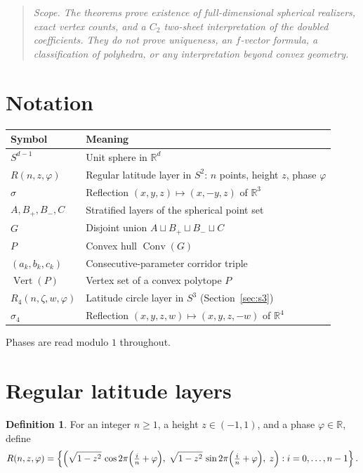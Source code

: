 \documentclass[11pt]{article}
\theoremstyle{definition}
\newtheorem{definition}[theorem]{Definition}
\theoremstyle{remark}
\newcommand{\Vertset}{\operatorname{Vert}}
\newcommand{\Conv}{\operatorname{Conv}}
\newcommand{\Ctwo}{C_2}
\begin{document}
\begin{quote}\itshape
Scope. The theorems prove existence of full-dimensional spherical
realizers, exact vertex counts, and a $\Ctwo$ two-sheet interpretation of
the doubled coefficients. They do not prove uniqueness, an $f$-vector
formula, a classification of polyhedra, or any interpretation beyond
convex geometry.
\end{quote}

\section{Notation}\label{sec:notation}

\begin{center}
\begin{tabular}{ll}
\toprule
Symbol & Meaning \\
\midrule
$S^{d-1}$ & Unit sphere in $\mathbb R^d$ \\
$R(n,z,\varphi)$ & Regular latitude layer in $S^2$: $n$ points, height $z$, phase $\varphi$ \\
$\sigma$ & Reflection $(x,y,z)\mapsto(x,-y,z)$ of $\mathbb R^3$ \\
$A, B_+, B_-, C$ & Stratified layers of the spherical point set \\
$G$ & Disjoint union $A\sqcup B_+\sqcup B_-\sqcup C$ \\
$P$ & Convex hull $\Conv(G)$ \\
$(a_k,b_k,c_k)$ & Consecutive-parameter corridor triple \\
$\Vertset(P)$ & Vertex set of a convex polytope $P$ \\
$R_4(n,\zeta,w,\varphi)$ & Latitude circle layer in $S^3$ (Section~\ref{sec:s3}) \\
$\sigma_4$ & Reflection $(x,y,z,w)\mapsto(x,y,z,-w)$ of $\mathbb R^4$ \\
\bottomrule
\end{tabular}
\end{center}

Phases are read modulo $1$ throughout.

\section{Regular latitude layers}\label{sec:layers}

\begin{definition}\label{def:layer}
For an integer $n\ge1$, a height $z\in(-1,1)$, and a phase
$\varphi\in\mathbb R$, define
\[
R(n,z,\varphi)=\left\{\left(\sqrt{1-z^2}\,\cos 2\pi\Bigl(\tfrac{i}{n}+\varphi\Bigr),\;
\sqrt{1-z^2}\,\sin 2\pi\Bigl(\tfrac{i}{n}+\varphi\Bigr),\; z\right) : i=0,\dots,n-1\right\}.
\]
\end{definition}
\end{document}
